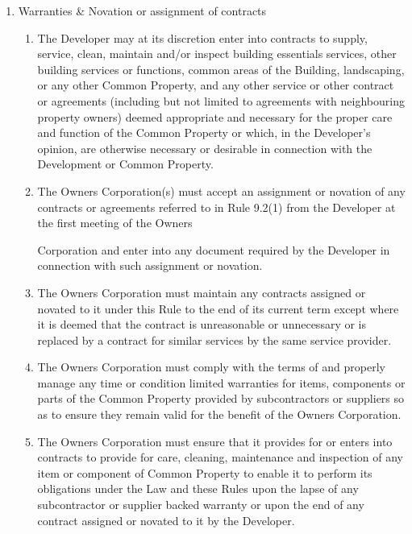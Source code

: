 \documentclass{article}
\begin{document}
\begin{enumerate}[label=\arabic*.]
\begin{enumerate}[label=\arabic{enumi}.\arabic*.]
\begin{enumerate}[label=\arabic{enumi}.\arabic*.]
\begin{enumerate}[label=(\arabic*)]
\end{enumerate}

\item  Warranties \& Novation or assignment of contracts

\begin{enumerate}[label=(\arabic*)]

\item  The Developer may at its discretion enter into contracts to supply, service, clean, maintain and/or inspect building essentials services, other building services or functions, common areas of the Building, landscaping, or any other Common Property, and any other service or other contract or agreements (including but not limited to agreements with neighbouring property owners) deemed appropriate and necessary for the proper care and function of the Common Property or which, in the Developer’s opinion, are otherwise necessary or desirable in connection with the Development or Common Property.

\item  The Owners Corporation(s) must accept an assignment or novation of any contracts or agreements referred to in Rule 9.2(1) from the Developer at the first meeting of the Owners
\newpage

Corporation and enter into any document required by the Developer in connection with such assignment or novation.

\item  The Owners Corporation must maintain any contracts assigned or novated to it under this Rule to the end of its current term except where it is deemed that the contract is unreasonable or unnecessary or is replaced by a contract for similar services by the same service provider.

\item  The Owners Corporation must comply with the terms of and properly manage any time or condition limited warranties for items, components or parts of the Common Property provided by subcontractors or suppliers so as to ensure they remain valid for the benefit of the Owners Corporation.

\item  The Owners Corporation must ensure that it provides for or enters into contracts to provide for care, cleaning, maintenance and inspection of any item or component of Common Property to enable it to perform its obligations under the Law and these Rules upon the lapse of any subcontractor or supplier backed warranty or upon the end of any contract assigned or novated to it by the Developer.


\end{enumerate}
\end{enumerate}
\end{enumerate}
\end{enumerate}
\end{document}
